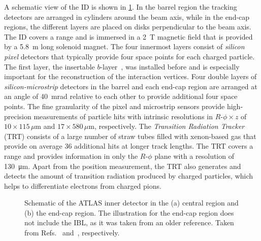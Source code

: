 A schematic view of the ID is shown in \cref{fig:ATLASinnerdetector}.
In the barrel region the tracking detectors are arranged in cylinders around the beam axis, while in the end-cap regions, the different layers are placed on disks perpendicular to the beam axis.
The ID covers a range  and is immersed in a \SI{2}{\tesla} magnetic field that is provided by a \SI{5.8}{\m} long solenoid magnet.
The four innermost layers consist of \emph{silicon pixel} detectors that typically provide four space points for each charged particle. The first layer, the insertable $b$-layer~\cite{ATLAS-TDR-19,PIX-2018-001}, was installed before \RunTwo and is especially important for the reconstruction of the interaction vertices.
Four double layers of \emph{silicon-microstrip} detectors in the barrel and each end-cap region are arranged at an angle of \SI{40}{\milli\radian} relative to each other to provide additional four space points. 
The fine granularity of the pixel and microstrip sensors provide high-precision measurements of particle hits with intrinsic resolutions in $R$-$\phi \times z$ of $10 \times 115\,\mu\text{m}$ and $17 \times 580\,\mu\text{m}$, respectively.
The \emph{Transition Radiation Tracker} (TRT) consists of a large number of straw tubes filled with xenon-based gas that provide on average 36 additional hits at longer track lengths. The TRT covers a range  and provides information in only the $R$-$\phi$ plane with a resolution of \SI{130}{\micro\meter}.
Apart from the position measurement, the TRT also generates and detects the amount of transition radiation produced by charged particles, which helps to differentiate electrons from charged pions.

\begin{figure}
    \caption{Schematic of the ATLAS inner detector in the (a) central region and (b) the end-cap region. The illustration for the end-cap region does not include the IBL, as it was taken from an older reference. Taken from Refs.~\cite{ATL-PHYS-PUB-2015-009} and~\cite{PERF-2007-01}, respectively.}
    \label{fig:ATLASinnerdetector}
\end{figure}


